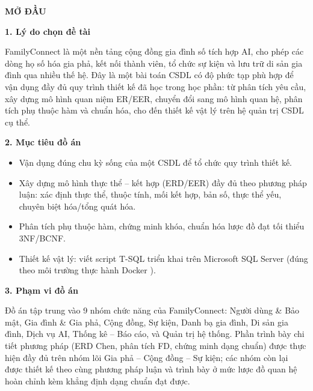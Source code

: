 
\clearpage
{}
{}
{\LARGE\bfseries MỞ ĐẦU}\par\vspace{1em}

{}
{\Large\bfseries 1. Lý do chọn đề tài}\par\vspace{0.7em}

FamilyConnect là một nền tảng cộng đồng gia đình số tích hợp AI, cho phép các dòng họ số hóa gia phả, kết nối thành viên, tổ chức sự kiện và lưu trữ di sản gia đình qua nhiều thế hệ. Đây là một bài toán CSDL có độ phức tạp phù hợp để vận dụng đầy đủ quy trình thiết kế đã học trong học phần: từ phân tích yêu cầu, xây dựng mô hình quan niệm ER/EER, chuyển đổi sang mô hình quan hệ, phân tích phụ thuộc hàm và chuẩn hóa, cho đến thiết kế vật lý trên hệ quản trị CSDL cụ thể.

{}
{\Large\bfseries 2. Mục tiêu đồ án}\par\vspace{0.7em}

\begin{itemize}
\item Vận dụng đúng chu kỳ sống của một CSDL để tổ chức quy trình thiết kế.
\item Xây dựng mô hình thực thể – kết hợp (ERD/EER) đầy đủ theo phương pháp luận: xác định thực thể, thuộc tính, mối kết hợp, bản số, thực thể yếu, chuyên biệt hóa/tổng quát hóa.
\item Phân tích phụ thuộc hàm, chứng minh khóa, chuẩn hóa lược đồ đạt tối thiểu 3NF/BCNF.
\item Thiết kế vật lý: viết script T-SQL triển khai trên Microsoft SQL Server (đúng theo môi trường thực hành Docker ).
\end{itemize}

{}
{\Large\bfseries 3. Phạm vi đồ án}\par\vspace{0.7em}

Đồ án tập trung vào 9 nhóm chức năng của FamilyConnect: Người dùng \& Bảo mật, Gia đình \& Gia phả, Cộng đồng, Sự kiện, Danh bạ gia đình, Di sản gia đình, Dịch vụ AI, Thống kê – Báo cáo, và Quản trị hệ thống. Phần trình bày chi tiết phương pháp (ERD Chen, phân tích FD, chứng minh dạng chuẩn) được thực hiện đầy đủ trên nhóm lõi Gia phả – Cộng đồng – Sự kiện; các nhóm còn lại được thiết kế theo cùng phương pháp luận và trình bày ở mức lược đồ quan hệ hoàn chỉnh kèm khẳng định dạng chuẩn đạt được.